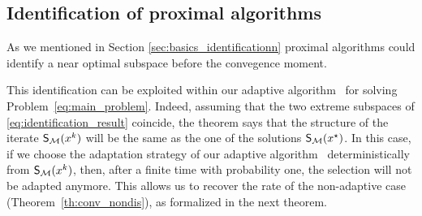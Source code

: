 


\subsection{Identification of proximal algorithms}\label{sec:identif}
{\color{red} As we mentioned in Section \ref{sec:basics_identificationn} proximal algorithms could identify a near optimal subspace before the convegence moment.}

This identification can be exploited within our adaptive algorithm \adaalgo~for solving Problem~\eqref{eq:main_problem}. Indeed, assuming that the two extreme subspaces of \eqref{eq:identification_result} coincide, the theorem says that the structure of the iterate $\S(x^k)$ will be the same as the one of the solutions $\S(x^\star)$. In this case, if we choose the adaptation strategy of our adaptive algorithm \adaalgo~deterministically from $\S(x^k)$, then, after a finite time with probability one,  the selection will not be adapted anymore. This allows us to recover the rate of the non-adaptive case (Theorem~\ref{th:conv_nondis}), as formalized in the next theorem.


